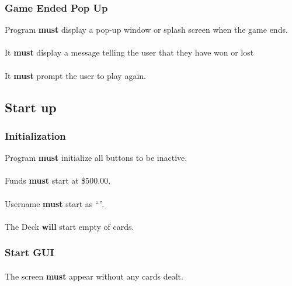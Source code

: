 \documentclass{article}
\begin{document}
\subsubsection{Game Ended Pop Up}Program \textbf{must} display a pop-up window or splash screen when the game ends.

\paragraph{}It \textbf{must} display a message telling the user that they have won or lost

\paragraph{}It \textbf{must} prompt the user to play again.

\subsection{Start up}


\subsubsection{Initialization}Program \textbf{must} initialize all buttons to be inactive.

\paragraph{}Funds \textbf{must}  start at \$500.00.

\paragraph{}Username \textbf{must}  start as ``''.

\paragraph{}{The Deck \textbf{will} start empty of cards.}


\subsubsection{Start GUI}

\paragraph{}The screen \textbf{must} appear without any cards dealt.
\end{document}
